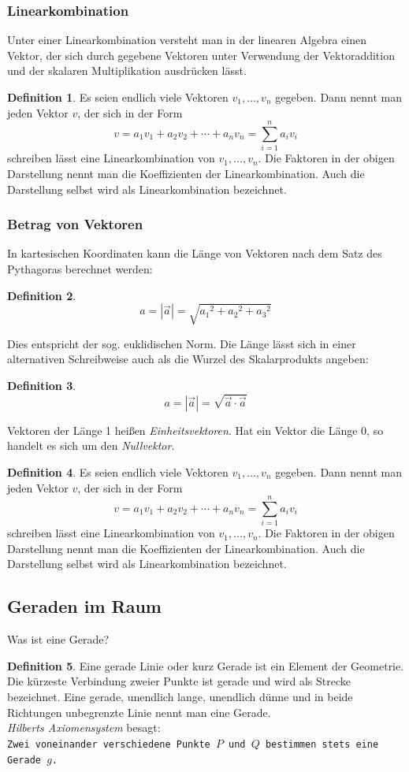 \documentclass[a4paper,10pt,DIV9, BCOR12mm, oneside,openright,openbib]{scrreprt}
\theoremstyle{definition}
\newtheorem{mydef}{Definition}[section]
\theoremstyle{plain}
\begin{document}
\subsubsection{Linearkombination} 
Unter einer Linearkombination versteht man in der linearen Algebra einen Vektor, der sich durch gegebene Vektoren unter Verwendung der Vektoraddition und der skalaren Multiplikation ausdrücken lässt.
 \begin{mydef}
 Es seien endlich viele Vektoren $v_1,\ldots,v_n$ gegeben. Dann nennt man jeden Vektor $v$, der sich in der Form    \[v = a_1 v_1 + a_2 v_2 + \dotsb + a_n v_n = \sum_{i=1}^{n} a_i v_i\]
schreiben lässt eine Linearkombination von $v_1,\dotsc,v_n$. Die Faktoren in der obigen Darstellung nennt man die Koeffizienten der Linearkombination. Auch die Darstellung selbst wird als Linearkombination bezeichnet.
 \end{mydef}
 
\subsubsection{Betrag von Vektoren}
In kartesischen Koordinaten kann die Länge von Vektoren nach dem Satz des Pythagoras berechnet werden:
  \begin{mydef}
    \[a = |\vec{a}| = \sqrt{{a_1}^2 + {a_2}^2 + {a_3}^2}\]
  \end{mydef}
Dies entspricht der sog. euklidischen Norm. Die Länge lässt sich in einer alternativen Schreibweise auch als die Wurzel des Skalarprodukts angeben:
  \begin{mydef}
    \[a = |\vec{a}| = \sqrt{\vec{a}\cdot\vec{a}}\]
  \end{mydef}
Vektoren der Länge 1 heißen \textit{Einheitsvektoren}. Hat ein Vektor die Länge 0, so handelt es sich um den \textit{Nullvektor}.
\begin{mydef}
 Es seien endlich viele Vektoren $v_1,\ldots,v_n$ gegeben. Dann nennt man jeden Vektor $v$, der sich in der Form    \[v = a_1 v_1 + a_2 v_2 + \dotsb + a_n v_n = \sum_{i=1}^{n} a_i v_i\]
schreiben lässt eine Linearkombination von $v_1,\dotsc,v_n$. Die Faktoren in der obigen Darstellung nennt man die Koeffizienten der Linearkombination. Auch die Darstellung selbst wird als Linearkombination bezeichnet.
  \end{mydef}
 
\subsection{Geraden im Raum}
Was ist eine Gerade?
\begin{mydef}
Eine gerade Linie oder kurz Gerade ist ein Element der Geometrie. Die kürzeste Verbindung zweier Punkte ist gerade und wird als Strecke bezeichnet. Eine gerade, unendlich lange, unendlich dünne und in beide Richtungen unbegrenzte Linie nennt man eine Gerade. \\
\textit{Hilberts Axiomensystem} besagt:\\
    \texttt{Zwei voneinander verschiedene Punkte $P$ und $Q$ bestimmen stets eine Gerade $g$.}
\end{mydef}
\end{document}
